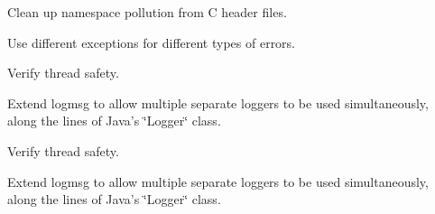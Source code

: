 
\begin{DoxyRefList}
\item[\label{todo__todo000001}%
\hypertarget{todo__todo000001}{}%
\-File \hyperlink{IPQ_8hpp}{\-I\-P\-Q.hpp} ]\-Clean up namespace pollution from \-C header files. 

\-Use different exceptions for different types of errors.  
\item[\label{todo__todo000002}%
\hypertarget{todo__todo000002}{}%
\-File \hyperlink{logmsg_8c}{logmsg.c} ]\-Verify thread safety. 

\-Extend logmsg to allow multiple separate loggers to be used simultaneously, along the lines of \-Java's \char`\"{}\-Logger\char`\"{} class.  
\item[\label{todo__todo000003}%
\hypertarget{todo__todo000003}{}%
\-File \hyperlink{Logmsg_8cpp}{\-Logmsg.cpp} ]\-Verify thread safety. 

\-Extend logmsg to allow multiple separate loggers to be used simultaneously, along the lines of \-Java's \char`\"{}\-Logger\char`\"{} class. 
\end{DoxyRefList}